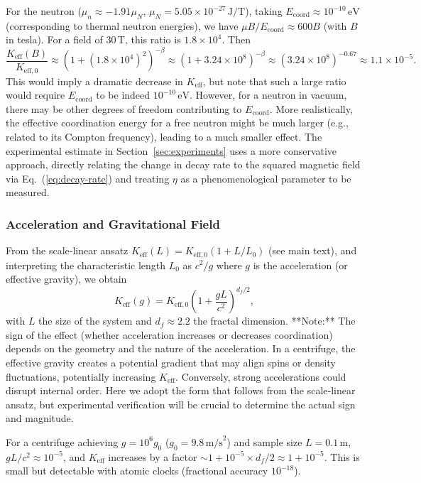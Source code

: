 \documentclass[12pt]{article}
\theoremstyle{remark}
\newcommand{\Keff}{K_{\mathrm{eff}}}
\newcommand{\Keffzero}{K_{\mathrm{eff},0}}
\newcommand{\df}{d_{\!f}}
\begin{document}
	For the neutron (\(\mu_n \approx -1.91\mu_N\), \(\mu_N = 5.05\times 10^{-27}\,\text{J/T}\)), taking \(E_{\mathrm{coord}} \approx 10^{-10}\,\text{eV}\) (corresponding to thermal neutron energies), we have \(\mu B / E_{\mathrm{coord}} \approx 600 B\) (with \(B\) in tesla). For a field of \(30\,\text{T}\), this ratio is \(1.8\times 10^4\). Then
	\[
	\frac{\Keff(B)}{\Keffzero} \approx (1 + (1.8\times10^4)^2)^{-\beta} \approx (1 + 3.24\times10^8)^{-\beta} \approx (3.24\times10^8)^{-0.67} \approx 1.1\times10^{-5}.
	\]
	This would imply a dramatic decrease in \(\Keff\), but note that such a large ratio would require \(E_{\mathrm{coord}}\) to be indeed \(10^{-10}\,\text{eV}\). However, for a neutron in vacuum, there may be other degrees of freedom contributing to \(E_{\mathrm{coord}}\). More realistically, the effective coordination energy for a free neutron might be much larger (e.g., related to its Compton frequency), leading to a much smaller effect. The experimental estimate in Section~\ref{sec:experiments} uses a more conservative approach, directly relating the change in decay rate to the squared magnetic field via Eq.~(\ref{eq:decay-rate}) and treating \(\eta\) as a phenomenological parameter to be measured.
	
	\subsubsection{Acceleration and Gravitational Field}
	
	From the scale‑linear ansatz \(\Keff(L) = \Keffzero (1 + L/L_0)\) (see main text), and interpreting the characteristic length \(L_0\) as \(c^2/g\) where \(g\) is the acceleration (or effective gravity), we obtain
	\begin{equation}
		\Keff(g) = \Keffzero \left(1 + \frac{gL}{c^2}\right)^{\df/2},
		\label{eq:keff-g}
	\end{equation}
	with \(L\) the size of the system and \(\df \approx 2.2\) the fractal dimension. **Note:** The sign of the effect (whether acceleration increases or decreases coordination) depends on the geometry and the nature of the acceleration. In a centrifuge, the effective gravity creates a potential gradient that may align spins or density fluctuations, potentially increasing \(\Keff\). Conversely, strong accelerations could disrupt internal order. Here we adopt the form that follows from the scale‑linear ansatz, but experimental verification will be crucial to determine the actual sign and magnitude.
	
	For a centrifuge achieving \(g = 10^6g_0\) (\(g_0 = 9.8\,\text{m/s}^2\)) and sample size \(L = 0.1\,\text{m}\), \(gL/c^2 \approx 10^{-5}\), and \(\Keff\) increases by a factor \(\sim 1 + 10^{-5}\times\df/2 \approx 1 + 10^{-5}\). This is small but detectable with atomic clocks (fractional accuracy \(10^{-18}\)).
	
\end{document}
